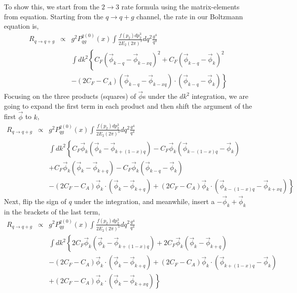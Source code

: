 To show this, we start from the $2\rightarrow 3$ rate formula using the matrix-elements from equation. 
Starting from the $q\rightarrow q+g$ channel, the rate in our Boltzmann equation is,
\begin{eqnarray}
R_{q\rightarrow q+g} &\propto& g^2 P_{qg}^{q(0)}(x) \int  \frac{f(p_2)dp_2^3}{2E_2(2\pi)^3} d q^2 \frac{g^4}{q^4}\\\nonumber
&&  \int d k^2\left\{
C_F\left( \vec{\phi}_{k-q}-\vec{\phi}_{k-xq} \right)^2
+ C_F\left( \vec{\phi}_{k-q}-\vec{\phi}_{k} \right)^2\right.\\\nonumber
&&\left.
- (2C_F-C_A)\left( \vec{\phi}_{k-q}-\vec{\phi}_{k-xq} \right)\cdot \left( \vec{\phi}_{k-q}-\vec{\phi}_{k} \right)
\right\}
\end{eqnarray}
Focusing on the three products (squares) of $\vec{\phi}$s under the $dk^2$ integration, we are going to expand the first term in each product and then shift the argument of the first $\vec{\phi}$ to $k$, 
\begin{eqnarray}
R_{q\rightarrow q+g} &\propto& g^2 P_{qg}^{q(0)}(x) \int  \frac{f(p_2)dp_2^3}{2E_2(2\pi)^3} d q^2 \frac{g^4}{q^4}\\\nonumber
&&  \int d k^2\left\{
C_F\vec{\phi}_{k}\left( \vec{\phi}_{k}-\vec{\phi}_{k+(1-x)q} \right)
- C_F\vec{\phi}_{k}\left( \vec{\phi}_{k-(1-x)q}-\vec{\phi}_{k} \right)\right.
\\\nonumber
&&+ C_F\vec{\phi}_{k}\left( \vec{\phi}_{k}-\vec{\phi}_{k+q} \right)
- C_F\vec{\phi}_{k}\left( \vec{\phi}_{k-q}-\vec{\phi}_{k} \right)
\\\nonumber
&&\left.
- (2C_F-C_A)\vec{\phi}_{k}\cdot \left( \vec{\phi}_{k}-\vec{\phi}_{k+q} \right)
+(2C_F-C_A)\vec{\phi}_{k} \cdot \left( \vec{\phi}_{k-(1-x)q}-\vec{\phi}_{k+xq} \right)
\right\}
\end{eqnarray}
Next, flip  the sign of $q$ under the integration,
and meanwhile, insert a $-\vec{\phi}_k +\vec{\phi}_k$ in the brackets of the last term,
\begin{eqnarray}
R_{q\rightarrow q+g} &\propto& g^2 P_{qg}^{q(0)}(x) \int  \frac{f(p_2)dp_2^3}{2E_2(2\pi)^3} d q^2 \frac{g^4}{q^4}\\\nonumber
&&  \int d k^2\left\{
2C_F\vec{\phi}_{k}\left( \vec{\phi}_{k}-\vec{\phi}_{k+(1-x)q} \right)
+ 2C_F\vec{\phi}_{k}\left( \vec{\phi}_{k}-\vec{\phi}_{k+q} \right)
\right.
\\\nonumber
&&
- (2C_F-C_A)\vec{\phi}_{k}\cdot \left( \vec{\phi}_{k}-\vec{\phi}_{k+q} \right)
+(2C_F-C_A)\vec{\phi}_{k} \cdot \left( \vec{\phi}_{k+(1-x)q} -\vec{\phi}_k \right) \\\nonumber
&&\left.+(2C_F-C_A)\vec{\phi}_{k} \cdot \left(\vec{\phi}_k-\vec{\phi}_{k+xq} \right)
\right\}
\end{eqnarray}
